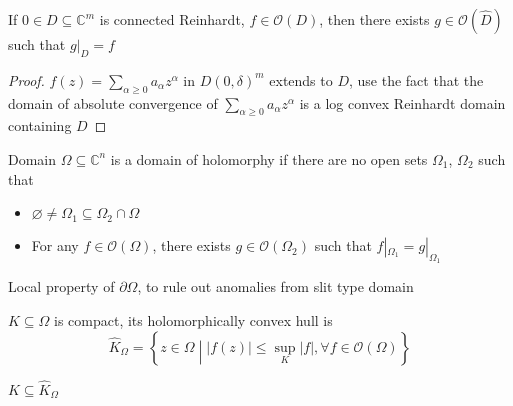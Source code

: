 \documentclass[../main.tex]{subfiles}
\begin{document}
\begin{theorem}
If $0\in D\subseteq\mathbb C^m$ is connected Reinhardt, $f\in\mathcal O(D)$, then there exists $g\in\mathcal O(\hat D)$ such that $g|_D=f$
\end{theorem}

\begin{proof}
$f(z)=\sum_{\alpha\geq0}a_{\alpha}z^\alpha$ in $D(0,\delta)^m$ extends to $D$, use the fact that the domain of absolute convergence of $\sum_{\alpha\geq0}a_{\alpha}z^\alpha$ is a log convex Reinhardt domain containing $D$
\end{proof}

\begin{definition}
Domain $\Omega\subseteq\mathbb C^n$ is a domain of holomorphy if there are no open sets $\Omega_1$, $\Omega_2$ such that
\begin{itemize}
\item $\varnothing\neq\Omega_1\subseteq\Omega_2\cap\Omega$\begin{center}
\end{center}
\item For any $f\in\mathcal O(\Omega)$, there exists $g\in\mathcal O(\Omega_2)$ such that $f|_{\Omega_1}=g|_{\Omega_1}$
\end{itemize}
\end{definition}

\begin{remark}
Local property of $\partial\Omega$, to rule out anomalies from slit type domain
\begin{center}
\end{center}
\end{remark}

\begin{definition}
$K\subseteq\Omega$ is compact, its holomorphically convex hull is
\[\hat K_\Omega=\left\{z\in\Omega\middle||f(z)|\leq\sup_K|f|,\forall f\in\mathcal O(\Omega)\right\}\]
\end{definition}

\begin{note}
$K\subseteq\hat K_\Omega$
\end{note}
\end{document}
